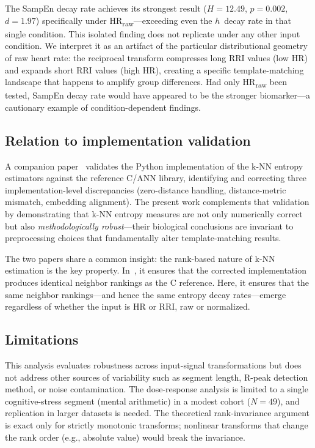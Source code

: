 \documentclass[12pt,a4paper]{article}
\begin{document}
The SampEn decay rate achieves its strongest result ($H = 12.49$, $p = 0.002$, $d = 1.97$) specifically under HR\textsubscript{raw}---exceeding even the $h$~decay rate in that single condition.
This isolated finding does not replicate under any other input condition.
We interpret it as an artifact of the particular distributional geometry of raw heart rate: the reciprocal transform compresses long RRI values (low HR) and expands short RRI values (high HR), creating a specific template-matching landscape that happens to amplify group differences.
Had only HR\textsubscript{raw} been tested, SampEn decay rate would have appeared to be the stronger biomarker---a cautionary example of condition-dependent findings.

\subsection{Relation to implementation validation}\label{sec:validation}

A companion paper~\citep{garnier2026} validates the Python implementation of the k-NN entropy estimators against the reference C/ANN library, identifying and correcting three implementation-level discrepancies (zero-distance handling, distance-metric mismatch, embedding alignment).
The present work complements that validation by demonstrating that k-NN entropy measures are not only numerically correct but also \emph{methodologically robust}---their biological conclusions are invariant to preprocessing choices that fundamentally alter template-matching results.

The two papers share a common insight: the rank-based nature of k-NN estimation is the key property.
In~\citet{garnier2026}, it ensures that the corrected implementation produces identical neighbor rankings as the C reference.
Here, it ensures that the same neighbor rankings---and hence the same entropy decay rates---emerge regardless of whether the input is HR or RRI, raw or normalized.

\subsection{Limitations}\label{sec:limitations}

This analysis evaluates robustness across input-signal transformations but does not address other sources of variability such as segment length, R-peak detection method, or noise contamination.
The dose-response analysis is limited to a single cognitive-stress segment (mental arithmetic) in a modest cohort ($N = 49$), and replication in larger datasets is needed.
The theoretical rank-invariance argument is exact only for strictly monotonic transforms; nonlinear transforms that change the rank order (e.g., absolute value) would break the invariance.
\end{document}
